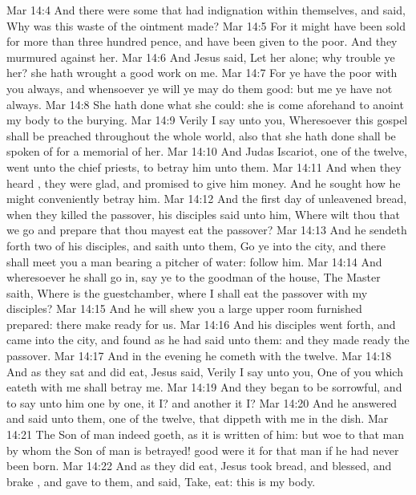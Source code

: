 \vs Mar 14:4 And there were some that had indignation within themselves, and said, Why was this waste of the ointment made?
\vs Mar 14:5 For it might have been sold for more than three hundred pence, and have been given to the poor. And they murmured against her.
\vs Mar 14:6 And Jesus said, Let her alone; why trouble ye her? she hath wrought a good work on me.
\vs Mar 14:7 For ye have the poor with you always, and whensoever ye will ye may do them good: but me ye have not always.
\vs Mar 14:8 She hath done what she could: she is come aforehand to anoint my body to the burying.
\vs Mar 14:9 Verily I say unto you, Wheresoever this gospel shall be preached throughout the whole world,  also that she hath done shall be spoken of for a memorial of her.
\vs Mar 14:10 And Judas Iscariot, one of the twelve, went unto the chief priests, to betray him unto them.
\vs Mar 14:11 And when they heard , they were glad, and promised to give him money. And he sought how he might conveniently betray him.
\vs Mar 14:12 And the first day of unleavened bread, when they killed the passover, his disciples said unto him, Where wilt thou that we go and prepare that thou mayest eat the passover?
\vs Mar 14:13 And he sendeth forth two of his disciples, and saith unto them, Go ye into the city, and there shall meet you a man bearing a pitcher of water: follow him.
\vs Mar 14:14 And wheresoever he shall go in, say ye to the goodman of the house, The Master saith, Where is the guestchamber, where I shall eat the passover with my disciples?
\vs Mar 14:15 And he will shew you a large upper room furnished  prepared: there make ready for us.
\vs Mar 14:16 And his disciples went forth, and came into the city, and found as he had said unto them: and they made ready the passover.
\vs Mar 14:17 And in the evening he cometh with the twelve.
\vs Mar 14:18 And as they sat and did eat, Jesus said, Verily I say unto you, One of you which eateth with me shall betray me.
\vs Mar 14:19 And they began to be sorrowful, and to say unto him one by one,  it I? and another  it I?
\vs Mar 14:20 And he answered and said unto them,  one of the twelve, that dippeth with me in the dish.
\vs Mar 14:21 The Son of man indeed goeth, as it is written of him: but woe to that man by whom the Son of man is betrayed! good were it for that man if he had never been born.
\vs Mar 14:22 And as they did eat, Jesus took bread, and blessed, and brake , and gave to them, and said, Take, eat: this is my body.
